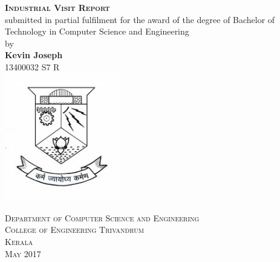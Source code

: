 \documentclass[a4paper,12pt]{report}
\begin{document}
	\begin{titlepage}
		\begin{centering}
		 
		
		\textsc{\textbf{\LARGE{Industrial Visit Report}}}\\[2cm]


		\large{submitted in partial fulfilment for the award of the degree of Bachelor of Technology in Computer Science and Engineering}\\[1.5cm]

		\large{by}\\[0.5cm]

		\textbf{Kevin Joseph     }\\
		{13400032 S7 R}\\[2cm]
		

		\includegraphics[width=5cm]{images/logo.jpg}

		\textsc{Department of Computer Science and Engineering}\\
		\textsc{College of Engineering Trivandrum}\\
		\textsc{Kerala}\\[0.5cm]
		\textsc{May 2017}\\
		\vfill %
		\end{centering}
	\end{titlepage}
\end{document}
